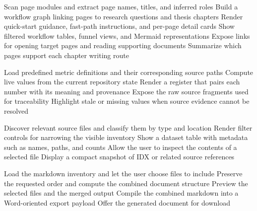 \begin{algorithm}[H]
Scan page modules and extract page names, titles, and inferred roles\;
Build a workflow graph linking pages to research questions and thesis chapters\;
Render quick-start guidance, fast-path instructions, and per-page detail cards\;
Show filtered workflow tables, funnel views, and Mermaid representations\;
Expose links for opening target pages and reading supporting documents\;
Summarize which pages support each chapter writing route\;
\caption{Streamlit Page Workflow Catalog}
\label{alg:streamlit-page-workflow}
\end{algorithm}

\begin{algorithm}[H]
Load predefined metric definitions and their corresponding source paths\;
Compute live values from the current repository state\;
Render a register that pairs each number with its meaning and provenance\;
Expose the raw source fragments used for traceability\;
Highlight stale or missing values when source evidence cannot be resolved\;
\caption{Live Numbers and Lineage Register}
\label{alg:live-numbers-lineage}
\end{algorithm}

\begin{algorithm}[H]
Discover relevant source files and classify them by type and location\;
Render filter controls for narrowing the visible inventory\;
Show a dataset table with metadata such as names, paths, and counts\;
Allow the user to inspect the contents of a selected file\;
Display a compact snapshot of IDX or related source references\;
\caption{Source Data Catalog}
\label{alg:source-data-catalog}
\end{algorithm}

\begin{algorithm}[H]
Load the markdown inventory and let the user choose files to include\;
Preserve the requested order and compute the combined document structure\;
Preview the selected files and the merged output\;
Compile the combined markdown into a Word-oriented export payload\;
Offer the generated document for download\;
\caption{Markdown to Word Compiler}
\label{alg:markdown-to-word}
\end{algorithm}

